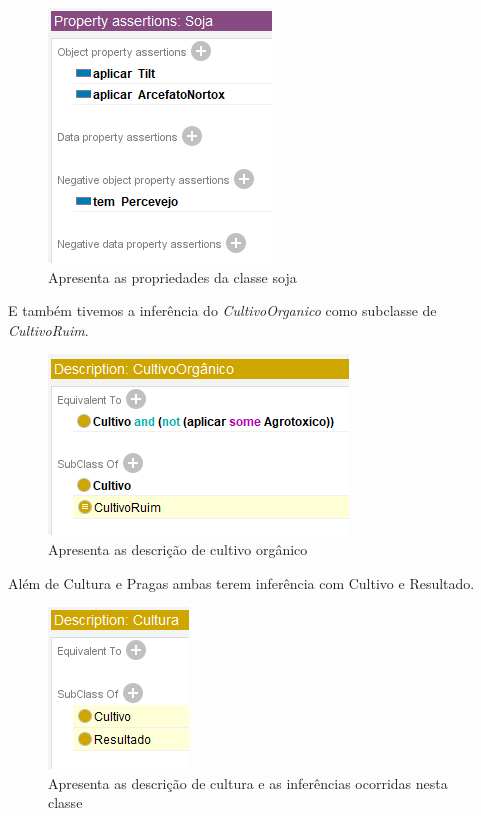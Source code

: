 \documentclass{article}
\begin{document}
     \begin{figure}[!htp]
        \centering %
        \includegraphics[width=.5\textwidth]{imagens/prop_soja.png} %
        \caption{Apresenta as propriedades da classe soja}
        \label{figura:descPropriedadeSoja}
    \end{figure}
    
    E também tivemos a inferência do \textit{CultivoOrganico} como subclasse de \textit{CultivoRuim}.
    
      \begin{figure}[!htp]
        \centering %
        \includegraphics[width=.5\textwidth]{imagens/Inf_6.png} %
        \caption{Apresenta as descrição de cultivo orgânico}
        \label{figura:desc\textit{CultivoOrganico}}
    \end{figure}
    
    Além de Cultura e Pragas ambas terem inferência com Cultivo e Resultado.

  \begin{figure}[!htp]
        \centering %
        \includegraphics[width=.5\textwidth]{imagens/Inf_7.png} %
        \caption{Apresenta as descrição de cultura e as inferências ocorridas nesta classe}
        \label{figura:descCulturaInferencia}
    \end{figure}
\end{document}
